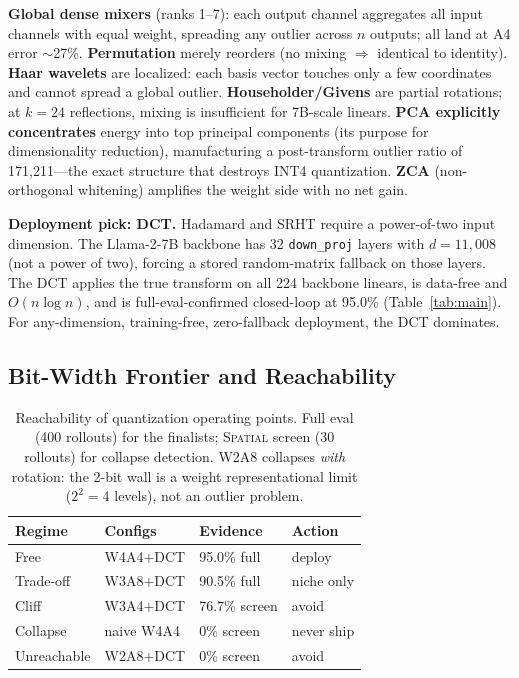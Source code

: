 \documentclass[conference]{IEEEtran}
\begin{document}
\textbf{Global dense mixers} (ranks 1--7): each output channel aggregates all input
channels with equal weight, spreading any outlier across $n$ outputs; all land at A4 error
$\sim$27\%. \textbf{Permutation} merely reorders (no mixing $\Rightarrow$ identical to
identity). \textbf{Haar wavelets} are localized: each basis vector touches only a few
coordinates and cannot spread a global outlier. \textbf{Householder/Givens} are partial
rotations; at $k=24$ reflections, mixing is insufficient for 7B-scale linears.
\textbf{PCA explicitly concentrates} energy into top principal components (its purpose for
dimensionality reduction), manufacturing a post-transform outlier ratio of
171{,}211---the exact structure that destroys INT4 quantization. \textbf{ZCA}
(non-orthogonal whitening) amplifies the weight side with no net gain.

\textbf{Deployment pick: DCT.} Hadamard and SRHT require a power-of-two input dimension.
The Llama-2-7B backbone has 32 \texttt{down\_proj} layers with $d=11{,}008$ (not a power
of two), forcing a stored random-matrix fallback on those layers. The DCT applies the true
transform on all 224 backbone linears, is data-free and $O(n\log n)$, and is
full-eval-confirmed closed-loop at 95.0\% (Table~\ref{tab:main}). For any-dimension,
training-free, zero-fallback deployment, the DCT dominates.

\subsection{Bit-Width Frontier and Reachability}
\label{sec:reach}

\begin{table}[h]\centering\small
\caption{Reachability of quantization operating points. Full eval (400 rollouts) for the
finalists; \textsc{Spatial} screen (30 rollouts) for collapse detection. W2A8 collapses
\emph{with} rotation: the 2-bit wall is a weight representational limit ($2^2=4$ levels),
not an outlier problem.}
\label{tab:reach}
\begin{tabular}{llll}
\toprule
Regime & Configs & Evidence & Action \\
\midrule
Free & W4A4+DCT & 95.0\% full & deploy \\
Trade-off & W3A8+DCT & 90.5\% full & niche only \\
Cliff & W3A4+DCT & 76.7\% screen & avoid \\
Collapse & naive W4A4 & 0\% screen & never ship \\
Unreachable & W2A8+DCT & 0\% screen & avoid \\
\bottomrule
\end{tabular}
\end{table}
\end{document}
